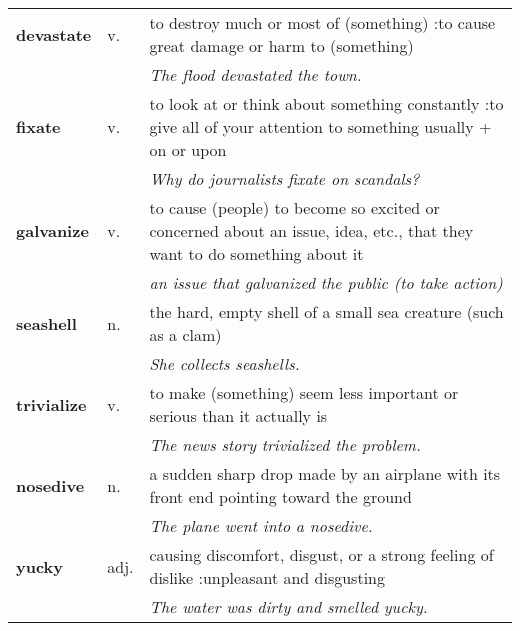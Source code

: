 \documentclass[a4paper]{article}
\begin{document}
\begin{longtable}{llp{11cm}}
\textbf{devastate} & v. &  to destroy much or most of (something) :to cause great damage or harm to (something) \\
 & & \textit{The flood devastated the town.}\\[0.08cm]
\textbf{fixate} & v. &  to look at or think about something constantly :to give all of your attention to something usually + on or upon \\
 & & \textit{Why do journalists fixate on scandals?}\\[0.08cm]
\textbf{galvanize} & v. &  to cause (people) to become so excited or concerned about an issue, idea, etc., that they want to do something about it \\
 & & \textit{an issue that galvanized the public (to take action)}\\[0.08cm]
\textbf{seashell} & n. &  the hard, empty shell of a small sea creature (such as a clam) \\
 & & \textit{She collects seashells.}\\[0.08cm]
\textbf{trivialize} & v. &  to make (something) seem less important or serious than it actually is \\
 & & \textit{The news story trivialized the problem.}\\[0.08cm]
\textbf{nosedive} & n. &  a sudden sharp drop made by an airplane with its front end pointing toward the ground \\
 & & \textit{The plane went into a nosedive.}\\[0.08cm]
\textbf{yucky} & adj. &  causing discomfort, disgust, or a strong feeling of dislike :unpleasant and disgusting \\
 & & \textit{The water was dirty and smelled yucky.}\\[0.08cm]
\end{longtable}
\end{document}
